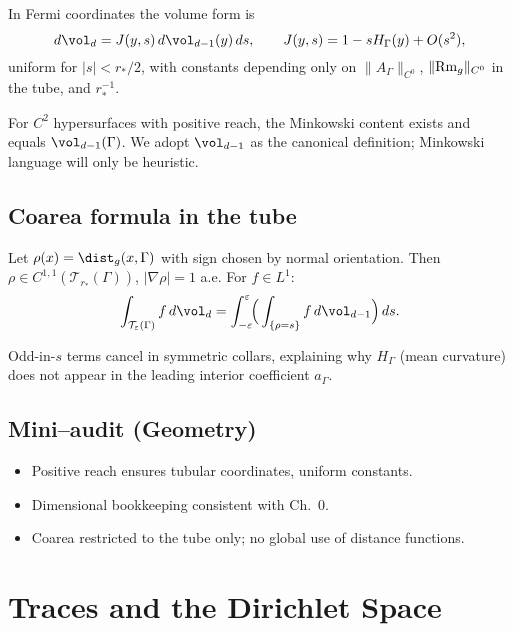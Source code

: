 \begin{lemma}
\label{lem:tube-jac}
In Fermi coordinates the volume form is
\[
d\vol_d = J(y,s)\,d\vol_{d-1}(y)\,ds,\qquad J(y,s)=1-sH_\Gamma(y)+O(s^2),
\]
uniform for $|s|<r_*/2$, with constants depending only on $\|A_\Gamma\|_{C^0}$, $\|{\rm Rm}_g\|_{C^0}$ in the tube, and $r_*^{-1}$.
\end{lemma}

\begin{remark}
For $C^2$ hypersurfaces with positive reach, the Minkowski content exists and equals $\vol_{d-1}(\Gamma)$. 
We adopt $\vol_{d-1}$ as the canonical definition; Minkowski language will only be heuristic.
\end{remark}

\subsection{Coarea formula in the tube}
Let $\rho(x)=\dist_g(x,\Gamma)$ with sign chosen by normal orientation. Then $\rho\in C^{1,1}(\mathcal T_{r_*}(\Gamma))$, $|\nabla\rho|=1$ a.e. 
For $f\in L^1$:
\[
\int_{\mathcal T_\varepsilon(\Gamma)} f\,d\vol_d
=\int_{-\varepsilon}^\varepsilon\!\!\Big(\int_{\{\rho=s\}} f\,d\vol_{d-1}\Big)\,ds.
\]

\begin{remark}
Odd-in-$s$ terms cancel in symmetric collars, explaining why $H_\Gamma$ (mean curvature) does not appear in the leading interior coefficient $a_\Gamma$.
\end{remark}

\subsection*{Mini–audit (Geometry)}
\begin{itemize}
  \item Positive reach ensures tubular coordinates, uniform constants.
  \item Dimensional bookkeeping consistent with Ch.~0.
  \item Coarea restricted to the tube only; no global use of distance functions.
\end{itemize}

\section{Traces and the Dirichlet Space}
\label{sec:traces}

